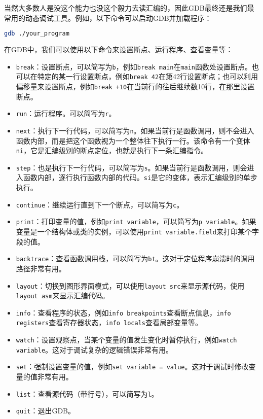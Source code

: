 当然大多数人是没这个能力也没这个毅力去读汇编的，因此GDB最终还是我们最常用的动态调试工具。例如，以下命令可以启动GDB并加载程序：
\begin{lstlisting}[language=bash]
    gdb ./your_program
\end{lstlisting}

在GDB中，我们可以使用以下命令来设置断点、运行程序、查看变量等：
\begin{itemize}
  \item \texttt{break}：设置断点，可以简写为\texttt{b}，例如\texttt{break main}在\texttt{main}函数处设置断点。也可以在特定的某一行设置断点，例如\texttt{break 42}在第42行设置断点；也可以利用偏移量来设置断点，例如\texttt{break +10}在当前行的往后继续数10行，在那里设置断点。
  \item \texttt{run}：运行程序。可以简写为\texttt{r}。
  \item \texttt{next}：执行下一行代码，可以简写为\texttt{n}。如果当前行是函数调用，则不会进入函数内部，而是把这个函数视为一个整体往下执行一行。该命令有一个变体\texttt{ni}，它是汇编级别的断点定位，也就是执行下一条汇编指令。
  \item \texttt{step}：也是执行下一行代码，可以简写为\texttt{s}。如果当前行是函数调用，则会进入函数内部，逐行执行函数内部的代码。\texttt{si}是它的变体，表示汇编级别的单步执行。
  \item \texttt{continue}：继续运行直到下一个断点，可以简写为\texttt{c}。
  \item \texttt{print}：打印变量的值，例如\texttt{print variable}，可以简写为\texttt{p variable}。如果变量是一个结构体或类的实例，可以使用\texttt{print variable.field}来打印某个字段的值。
  \item \texttt{backtrace}：查看函数调用栈，可以简写为\texttt{bt}。这对于定位程序崩溃时的调用路径非常有用。
  \item \texttt{layout}：切换到图形界面模式，可以使用\texttt{layout src}来显示源代码，使用\texttt{layout asm}来显示汇编代码。
  \item \texttt{info}：查看程序的状态，例如\texttt{info breakpoints}查看断点信息，\texttt{info registers}查看寄存器状态，\texttt{info locals}查看局部变量等。
  \item \texttt{watch}：设置观察点，当某个变量的值发生变化时暂停执行，例如\texttt{watch variable}。这对于调试复杂的逻辑错误非常有用。
  \item \texttt{set}：强制设置变量的值，例如\texttt{set variable = value}。这对于调试时修改变量的值非常有用。
  \item \texttt{list}：查看源代码（带行号），可以简写为\texttt{l}。
  \item \texttt{quit}：退出GDB。
\end{itemize}

